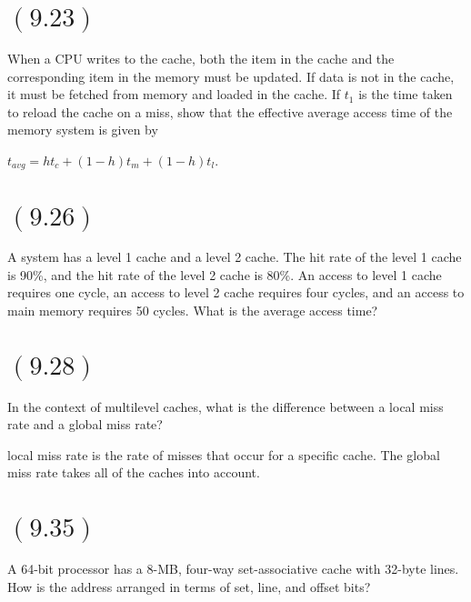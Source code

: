 \documentclass[letterpaper,12pt,titlepage]{article}
\begin{document}
\section*{$(9.23)$} When a CPU writes to the cache, both the item in the cache and the corresponding item in the memory must be updated. If data is not in the cache, it must be fetched from memory and loaded in the cache. If $t_1$ is the time taken to reload the cache on a miss, show that the effective average access time of the memory system is given by

$t_{avg} = ht_{c} + (1 - h)t_{m} + (1 - h)t_{l}$.

\begin{mdframed}[style=MyFrame]
\end{mdframed}

\section*{$(9.26)$} A system has a level 1 cache and a level 2 cache. The hit rate of the level 1 cache is 90\%, and the hit rate of the level 2 cache is 80\%. An access to level 1 cache requires one cycle, an access to level 2 cache requires four cycles, and an access to main memory requires 50 cycles. What is the average access time?

\begin{mdframed}[style=MyFrame]
\end{mdframed}

\section*{$(9.28)$} In the context of multilevel caches, what is the difference between a local miss rate and a global miss rate?

\begin{mdframed}[style=MyFrame]
local miss rate is the rate of misses that occur for a specific cache. The global miss rate takes all of the caches into account.
\end{mdframed}

\section*{$(9.35)$} A 64-bit processor has a 8-MB, four-way set-associative cache with 32-byte lines. How is the address arranged in terms of set, line, and offset bits?

\begin{mdframed}[style=MyFrame]
\end{mdframed}
\end{document}

